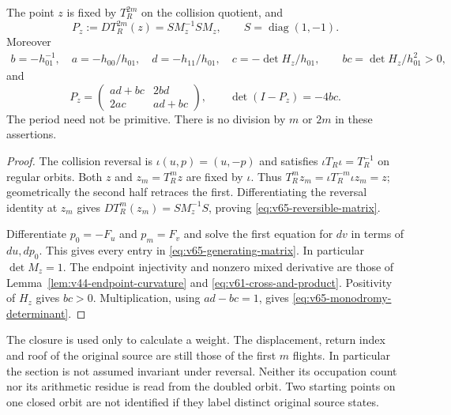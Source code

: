 \begin{lemma}
\label{lem:v65-reversible-matrix}
The point $z$ is fixed by $T_R^{2m}$ on the collision quotient, and
\begin{equation}\label{eq:v65-reversible-matrix}
 P_z:=D T_R^{2m}(z)=S M_z^{-1}S M_z,
       \qquad S=\operatorname{diag}(1,-1).
\end{equation}
Moreover
\begin{align}\label{eq:v65-generating-matrix}
 b=-h_{01}^{-1},\quad a=-h_{00}/h_{01},\quad
 d=-h_{11}/h_{01},\quad c=-\det H_z/h_{01},
 \qquad bc=\det H_z/h_{01}^2>0,
\end{align}
and
\begin{equation}\label{eq:v65-monodromy-determinant}
 P_z=\begin{pmatrix}ad+bc&2bd\\2ac&ad+bc\end{pmatrix},\qquad
 \det(I-P_z)=-4bc.
\end{equation}
The period need not be primitive. There is no division by $m$ or
$2m$ in these assertions.
\end{lemma}
\begin{proof}
The collision reversal is $\iota(u,p)=(u,-p)$ and satisfies
$\iota T_R\iota=T_R^{-1}$ on regular orbits. Both $z$ and
$z_m=T_R^m z$ are fixed by $\iota$. Thus
$T_R^m z_m=\iota T_R^{-m}\iota z_m=z$; geometrically the second
half retraces the first. Differentiating the reversal identity at
$z_m$ gives $D T_R^m(z_m)=S M_z^{-1}S$, proving
\eqref{eq:v65-reversible-matrix}.

Differentiate $p_0=-F_u$ and $p_m=F_v$ and solve the first equation
for $dv$ in terms of $du,dp_0$. This gives every entry in
\eqref{eq:v65-generating-matrix}. In particular $\det M_z=1$.
The endpoint injectivity and nonzero mixed derivative are those of
Lemma~\ref{lem:v44-endpoint-curvature} and
\eqref{eq:v61-cross-and-product}. Positivity of $H_z$ gives $bc>0$.
Multiplication, using $ad-bc=1$, gives
\eqref{eq:v65-monodromy-determinant}.
\end{proof}

The closure is used only to calculate a weight. The displacement,
return index and roof of the original source are still those of the
first $m$ flights. In particular the section is not assumed invariant
under reversal. Neither its occupation count nor its arithmetic
residue is read from the doubled orbit. Two starting points on one
closed orbit are not identified if they label distinct original
source states.

